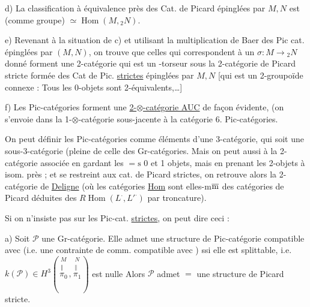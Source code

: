 d) La classification à équivalence près des Cat. de Picard épinglées par $M,N$ est (comme groupe) $\simeq\operatorname{Hom}(M,{}_2N)$.

e) Revenant à la situation de c) et utilisant la multiplication de Baer des Pic cat. épinglées par $(M,N)$, on trouve que  celles qui correspondent à un $\sigma\colon M\longrightarrow{}_2N$ donné forment une 2-catégorie qui est un -torseur sous la 2-catégorie de Picard stricte formée des Cat de Pic. \uline{strictes} épinglées par $M,N$  [qui est un 2-groupoïde connexe : Tous les 0-objets sont 2-équivalents,\ldots] 

f) Les Pic-catégories forment une \uline{2-$\otimes$-catégorie  AUC} de façon évidente,  (on s'envoie dans  la 1-$\otimes$-catégorie  sous-jacente à la catégorie 
6. Pic-catégories.

On peut définir les Pic-catégories comme éléments d'une 3-catégorie, qui soit une sous-3-catégorie (pleine  de celle des Gr-catégories.  Mais on peut aussi  à la 2-catégorie associée en gardant les $=\mathrm s$ 0 et 1 objets, mais en prenant les 2-objets à isom. près ;  et  se restreint aux cat. de Picard strictes, on retrouve alors la 2-catégorie de \uline{Deligne} (où les catégories \uline{Hom} sont elles-m$\overline{\rm m}$ des catégories de Picard déduites des $R\operatorname{Hom}(L^{\displaystyle\cdot},L'^{\displaystyle\cdot})$ par troncature).

Si on n'insiste pas sur les Pic-cat. \uline{strictes}, on peut dire ceci :

a) Soit $\mathscr P$ une Gr-catégorie. Elle admet une structure de Pic-catégorie compatible avec  (i.e. une  contrainte de comm. compatible avec ) ssi elle est splittable, i.e. $k(\mathscr P)\in H^3(\overset{\substack{M\\ \Vert}}{\pi_0},\overset{\substack{N\\ \Vert}}{\pi_1})$ est nulle Alors $\mathscr P$ admet $=$ une structure de Picard stricte.

